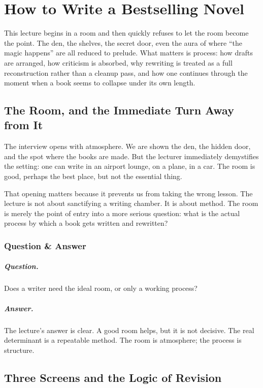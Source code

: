 \chapter{How to Write a Bestselling Novel}

This lecture begins in a room and then quickly refuses to let the room become the point. The den, the shelves, the secret door, even the aura of where ``the magic happens'' are all reduced to prelude. What matters is process: how drafts are arranged, how criticism is absorbed, why rewriting is treated as a full reconstruction rather than a cleanup pass, and how one continues through the moment when a book seems to collapse under its own length.

\section{The Room, and the Immediate Turn Away from It}

The interview opens with atmosphere. We are shown the den, the hidden door, and the spot where the books are made. But the lecturer immediately demystifies the setting: one can write in an airport lounge, on a plane, in a car. The room is good, perhaps the best place, but not the essential thing.

That opening matters because it prevents us from taking the wrong lesson. The lecture is not about sanctifying a writing chamber. It is about method. The room is merely the point of entry into a more serious question: what is the actual process by which a book gets written and rewritten?

\subsection{Question \& Answer}

\paragraph{Question.} Does a writer need the ideal room, or only a working process?

\paragraph{Answer.} The lecture's answer is clear. A good room helps, but it is not decisive. The real determinant is a repeatable method. The room is atmosphere; the process is structure.

\section{Three Screens and the Logic of Revision}

